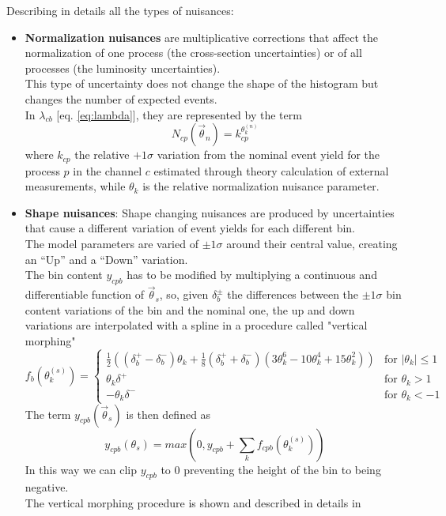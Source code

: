 Describing in details all the types of nuisances:
\begin{itemize}
    \item \textbf{Normalization nuisances} are multiplicative corrections that affect the normalization of one process (\eg the cross-section uncertainties) or of all processes (\eg the luminosity uncertainties).\\
    This type of uncertainty does not change the shape of the histogram but changes the number of expected events.\\
    In $\lambda_{cb}$ [eq. \ref{eq:lambda}], they are represented by the term
    \begin{equation}
        N_{cp}\left(\vec{\theta}_n\right)=k_{cp}^{\theta^{(n)}_k}
    \end{equation}
    where $k_{cp}$ the relative $+1 \sigma$ variation from the nominal event yield for the process $p$ in the channel $c$ estimated through theory calculation of external measurements, while $\theta_{k}$ is the relative normalization nuisance parameter.\\
    \item \textbf{Shape nuisances}: Shape changing nuisances are produced by uncertainties
    that cause a different variation of event yields for each different bin.\\
    The model parameters are varied of $\pm 1 \sigma$ around their central value, creating an “Up” and a “Down” variation.\\
    The bin content $y_{cpb}$ has to be modified by multiplying a continuous and differentiable function of $\vec{\theta}_{s}$, so, given $\delta_b^\pm$ the differences between the $\pm 1 \sigma$ bin content variations of the bin and the nominal one, the up and down variations are interpolated with a spline in a procedure called "vertical morphing" \ADDREF
    \begin{equation}
    f_b\left(\theta_k^{(s)}\right)=
        \begin{cases}
            {\frac{1}{2}}\left((\delta_b^{+}-\delta_b^{-})\theta_k+{\frac{1}{8}}(\delta_b^{+}+\delta_b^{-})(3\theta_k^{6}-10\theta_k^{4}+15\theta_k^{2})\right) & \text{for } |\theta_k|\leq 1\\
            \theta_k \delta^+ & \text{for } \theta_k>1\\
            -\theta_k \delta^{-} & \text{for } \theta_k<-1
        \end{cases}
    \end{equation}
    The term $y_{cpb}(\vec{\theta}_s)$ is then defined as 
    \begin{equation}
        y_{cpb}(\theta_s)=max\left(0,y_{cpb}+\sum_k f_{cpb}\left(\theta_k^{(s)} \right)\right)
    \end{equation}
    In this way we can clip $y_{cpb}$ to 0 preventing the height of the bin to being negative.\\
    The vertical morphing procedure is shown and described in details in 


\end{itemize}
